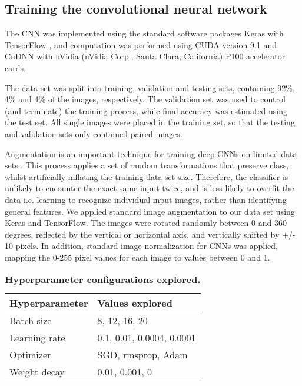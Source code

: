 \documentclass[10pt,letterpaper]{article}
\begin{document}
\subsection*{Training the convolutional neural network}

The CNN was implemented using the standard software packages Keras \citep{keras} with TensorFlow \citep{abadi2016tensorflow}, and computation was performed using CUDA version 9.1 and CuDNN with nVidia (nVidia Corp., Santa Clara, California) P100 accelerator cards.

The data set was split into training, validation and testing sets, containing 92\%, 4\% and 4\% of the images, respectively. The validation set was used to control (and terminate) the training process, while final accuracy was estimated using the test set. All single images were placed in the training set, so that the testing and validation sets only contained paired images.

Augmentation is an important technique for training deep CNNs on limited data sets \citep{krizhevsky2012imagenet}. This process applies a set of random transformations that preserve class, whilst artificially inflating the training data set size. Therefore, the classifier is unlikely to encounter the exact same input twice, and is less likely to overfit the data i.e. learning to recognize individual input images, rather than identifying general features.
We applied standard image augmentation to our data set using Keras and TensorFlow. The images were rotated randomly between 0 and 360 degrees, reflected by the vertical or horizontal axis, and vertically shifted by +/- 10 pixels.
In addition, standard image normalization for CNNs was applied, mapping the 0-255 pixel values for each image to values between 0 and 1.

\begin{table}[hbt!]
  \centering
  \caption{\textbf{Hyperparameter configurations explored.}}
  \begin{tabular}{ l|l }
    Hyperparameter & Values explored \\
    \hline
    Batch size    &  8, 12, 16, 20 \\
    Learning rate &  0.1, 0.01, 0.0004, 0.0001 \\
    Optimizer     &  SGD, rmsprop, Adam \\
    Weight decay  &  0.01, 0.001, 0 \\
  \end{tabular}
  \label{tab:hyper}
\end{table}
\end{document}

